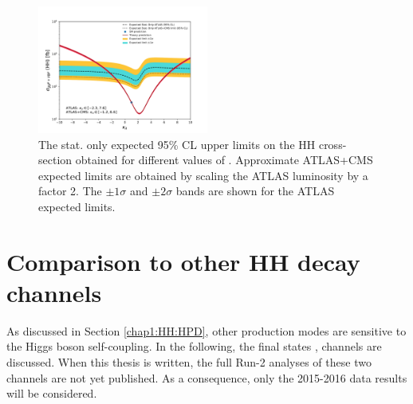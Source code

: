 \begin{figure}[htbp]
    \centering
    \includegraphics[width=0.5\textwidth]{Ch5/Img/kappa_lambda_ATLAS_CMS_stat.pdf}
    \begin{tcolorbox}[colback=black!5!white, colframe=white!75!black]
    \caption{The stat. only expected 95\% CL upper limits on the HH cross-section obtained for different values of \kl. Approximate ATLAS+CMS expected limits are obtained by scaling the ATLAS luminosity by a factor 2. The $\pm1\sigma$ and $\pm2\sigma$ bands are shown for the ATLAS expected limits.}
    \label{fig:HHyybb:CMS+ATLAS}
    \end{tcolorbox}
\end{figure}


\section{Comparison to other HH decay channels}
\label{HHyybb:HH}
As discussed in Section \ref{chap1:HH:HPD}, other production modes are sensitive to the Higgs boson self-coupling. In the following, the final states \bbbb, \bbtt channels are discussed. When this thesis is written, the full Run-2 analyses of these two channels are not yet published. As a consequence, only the 2015-2016 data results will be considered.

